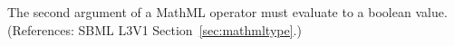 The second argument of a MathML  operator must evaluate to
a boolean value.  (References: SBML L3V1 Section~\ref{sec:mathmltype}.)
